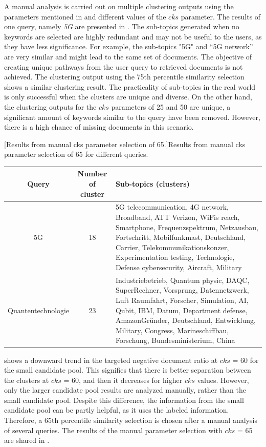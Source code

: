  
A manual analysis is carried out on multiple clustering outputs using the parameters mentioned in  and different values of the $cks$ parameter. The results of one query, namely \emph{5G} are presented in . The sub-topics generated when no keywords are selected are highly redundant and may not be useful to the users, as they have less significance. For example, the sub-topics "5G" and ``5G network'' are very similar and might lead to the same set of documents. The objective of creating unique pathways from the user query to retrieved documents is not achieved. The clustering output using the 75th percentile similarity selection shows a similar clustering result. The practicality of sub-topics in the real world is only successful when the clusters are unique and diverse. On the other hand, the clustering outputs for the $cks$ parameters of 25 and 50 are unique, a significant amount of keywords similar to the query have been removed. However, there is a high chance of missing documents in this scenario.
 
 
 \begin{center}
 	[Results from manual cks parameter selection of 65.]{Results from manual cks parameter selection of 65 for different queries. }\label{tab:65_output}
 	\begin{tabularx}{.9\textwidth}{|c|c|Y|}
 		\hline
 		Query & Number of cluster & Sub-topics (clusters)\\
 		\hline
 		
 		5G  &          18 & 5G telecommunication, 4G network, Broadband, ATT Verizon, WiFis reach, Smartphone, Frequenzspektrum, Netzausbau, Fortschritt, Mobilfunkmast, Deutschland, Carrier, Telekommunikationskonzer, Experimentation testing, Technologie, Defense cybersecurity, Aircraft, Military \\  \hline
 		
 		Quantentechnologie &          23 & Industriebetrieb, Quantum physic, DAQC, SuperRechner, Vorsprung, Datennetzwerk, Luft Raumfahrt, Forscher, Simulation, AI, Qubit, IBM, Datum, Department defense, AmazonGründer, Deutschland, Entwicklung, Military, Congress, Marineschiffbau, Forschung, Bundesministerium, China \\  \hline
 		
 	\end{tabularx}
 
  \end{center}


 shows a downward trend in the targeted negative document ratio at $cks$ = 60 for the small candidate pool. This signifies that there is better separation between the clusters at $cks$ = 60, and then it decreases for higher $cks$ values. However, only the larger candidate pool results are analyzed manually, rather than the small candidate pool. Despite this difference, the information from the small candidate pool can be partly helpful, as it uses the labeled information. Therefore, a 65th percentile similarity selection is chosen after a manual analysis of several queries. The results of the manual parameter selection with $cks$ = 65 are shared in . 

